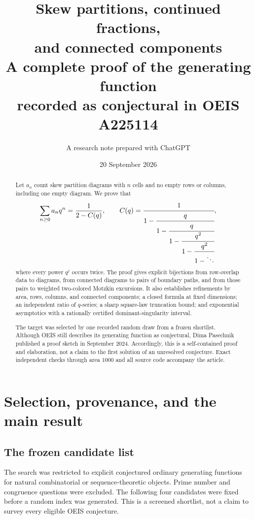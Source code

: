 \documentclass[11pt,letterpaper]{article}
\title{\vspace{-1.2em}\textbf{Skew partitions, continued fractions,\\
 and connected components}\\[0.65em]
 \large A complete proof of the generating function\\
 recorded as conjectural in OEIS A225114}
\author{A research note prepared with ChatGPT}
\date{20 September 2026}
\numberwithin{equation}{section}
\theoremstyle{definition}
\begin{document}
\maketitle
\thispagestyle{plain}

\begin{abstract}
Let $a_n$ count skew partition diagrams with $n$ cells and no empty rows or
columns, including one empty diagram. We prove that
\[
 \sum_{n\ge0}a_nq^n=\frac{1}{2-C(q)},\qquad
 C(q)=\cfrac{1}{1-\cfrac{q}{1-\cfrac{q}{1-\cfrac{q^2}{1-\cfrac{q^2}{1-\ddots}}}}},
\]
where every power $q^j$ occurs twice. The proof gives explicit bijections from
row-overlap data to diagrams, from connected diagrams to pairs of boundary
paths, and from those pairs to weighted two-colored Motzkin excursions.
It also establishes refinements by area, rows, columns, and connected
components; a closed formula at fixed dimensions; an independent ratio of
$q$-series; a sharp square-law truncation bound; and exponential asymptotics
with a rationally certified dominant-singularity interval.

The target was selected by one recorded random draw from a frozen shortlist.
Although OEIS still describes its generating function as conjectural, Dima
Pasechnik published a proof sketch in September 2024. Accordingly, this is a
self-contained proof and elaboration, not a claim to the first solution of
an unresolved conjecture. Exact independent checks through area $1000$ and
all source code accompany the article.
\end{abstract}

\newpage
\begingroup
\small
\setlength{\parskip}{0pt}
\tableofcontents
\endgroup
\newpage

\section{Selection, provenance, and the main result}
\label{sec:selection}

\subsection{The frozen candidate list}
The search was restricted to explicit conjectured ordinary generating
functions for natural combinatorial or sequence-theoretic objects. Prime
number and congruence questions were excluded. The following four candidates
were fixed before a random index was generated. This is a screened shortlist,
not a claim to survey every eligible OEIS conjecture.
\end{document}
